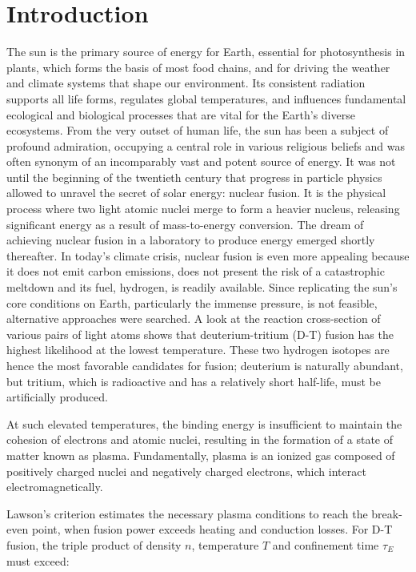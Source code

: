 \chapter{Introduction}
\label{chap:Intro}
The sun is the primary source of energy for Earth, essential for photosynthesis in plants, which forms the basis of most food chains, and for driving the weather and climate systems that shape our environment. Its consistent radiation supports all life forms, regulates global temperatures, and influences fundamental ecological and biological processes that are vital for the Earth's diverse ecosystems. From the very outset of human life, the sun has been a subject of profound admiration, occupying a central role in various religious beliefs and was often synonym of an incomparably vast and potent source of energy. It was not until the beginning of the twentieth century that progress in particle physics allowed to unravel the secret of solar energy: nuclear fusion. It is the physical process where two light atomic nuclei merge to form a heavier nucleus, releasing significant energy as a result of mass-to-energy conversion. \newline 
The dream of achieving nuclear fusion in a laboratory to produce energy emerged shortly thereafter. In today's climate crisis, nuclear fusion is even more appealing because it does not emit carbon emissions, does not present the risk of a catastrophic meltdown and its fuel, hydrogen, is readily available. Since replicating the sun's core conditions on Earth, particularly the immense pressure, is not feasible, alternative approaches were searched. A look at the reaction cross-section of various pairs of light atoms shows that deuterium-tritium (D-T) fusion has the highest likelihood at the lowest temperature. These two hydrogen isotopes are hence the most favorable candidates for fusion; deuterium is naturally abundant, but tritium, which is radioactive and has a relatively short half-life, must be artificially produced. \newline

At such elevated temperatures, the binding energy is insufficient to maintain the cohesion of electrons and atomic nuclei, resulting in the formation of a state of matter known as plasma. Fundamentally, plasma is an ionized gas composed of positively charged nuclei and negatively charged electrons, which interact electromagnetically. \newline

Lawson's criterion\cite{Lawson1957} estimates the necessary plasma conditions to reach the break-even point, when fusion power exceeds heating and conduction losses. For D-T fusion, the triple product of density $n$, temperature $T$ and confinement time $\tau_E$ must exceed:

